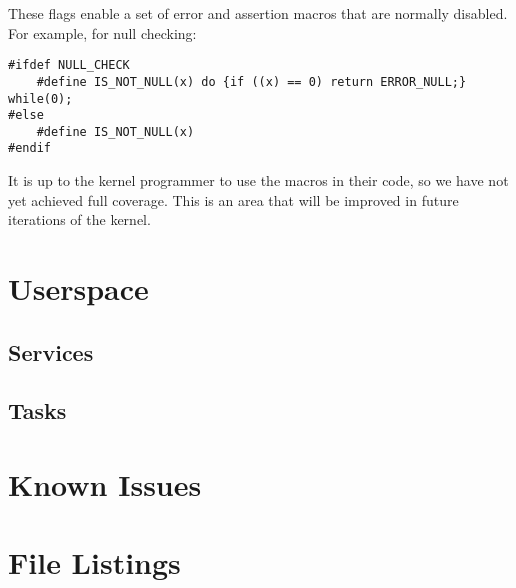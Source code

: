 \documentclass[twoside,a4paper]{refart}
\begin{document}
These flags enable a set of error and assertion macros that are normally disabled. For example, for null checking:

\begin{verbatim}
#ifdef NULL_CHECK
    #define IS_NOT_NULL(x) do {if ((x) == 0) return ERROR_NULL;} while(0);
#else
    #define IS_NOT_NULL(x)
#endif
\end{verbatim}

It is up to the kernel programmer to use the macros in their code, so we have not yet achieved full coverage. This is an area that will be improved in future iterations of the kernel. 
\section{Userspace}
\subsection{Services}
\subsection{Tasks}

\section{Known Issues}
\section{File Listings}

\printindex
\end{document}
